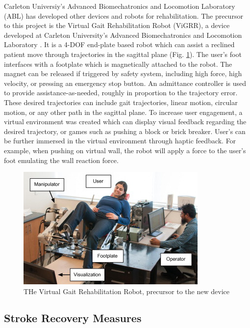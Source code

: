 \documentclass[12pt]{report}
\begin{document}
	Carleton Universiy's Advanced Biomechatronics and Locomotion Laboratory (ABL) has developed other devices and robots for rehabilitation. The precursor to this project is the Virtual Gait Rehabilitation Robot (ViGRR), a device developed at Carleton University's Advanced Biomechatronics and Locomotion Laboratory \cite{Chisholm2014, Chisholm2010}. It is a 4-DOF end-plate based robot which can assist a reclined patient move through trajectories in the sagittal plane (Fig. \ref{fig:vigrr}). The user's foot interfaces with a footplate which is magnetically attached to the robot. The magnet can be released if triggered by safety system, including high force, high velocity, or pressing an emergency stop button. An admittance controller is used to provide assistance-as-needed, roughly in proportion to the trajectory error. These desired trajectories can include gait trajectories, linear motion, circular motion, or any other path in the sagittal plane. To increase user engagement, a virtual environment was created which can display visual feedback regarding the desired trajectory, or games such as pushing a block or brick breaker. User's can be further immersed in the virtual environment through haptic feedback. For example, when pushing on virtual wall, the robot will apply a force to the user's foot emulating the wall reaction force. 
	
	
	\begin{figure}[t] 
		\centering
		\includegraphics[width=0.75\linewidth]{Vigrr}
		\caption{THe Virtual Gait Rehabilitation Robot, precursor to the new device}
		\label{fig:vigrr}
	\end{figure}	
	
	

	\subsection{Stroke Recovery Measures}
	
\end{document}
